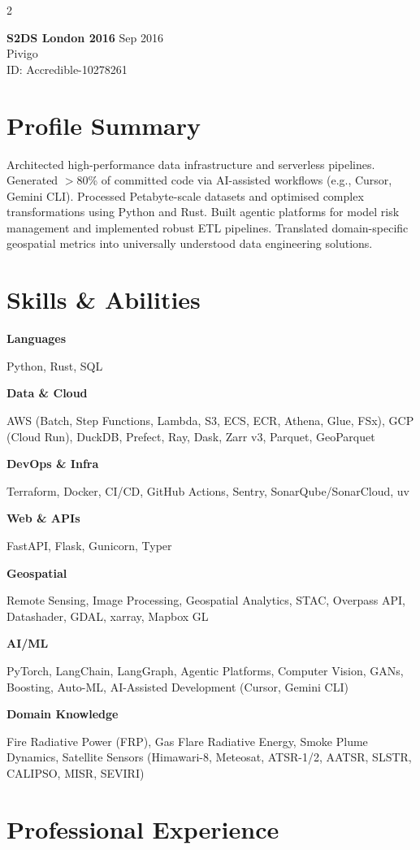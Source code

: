 \documentclass[10pt,a4paper]{article}
\newcommand{\cvitem}[2]{\textbf{#1} \hspace*{\fill} {\small\color{textlight}#2}\\}
\newcommand{\cvsubitem}[1]{{\small\color{textlight}#1}\\}
\newcommand{\skillgroup}[2]{\textbf{#1}\par\vspace{0.2em}#2\par\vspace{0.8em}}
\begin{document}
\begin{paracol}{2}
\begin{leftcolumn}
\cvitem{S2DS London 2016}{Sep 2016}
\cvsubitem{Pivigo}
\cvsubitem{ID: Accredible-10278261}

\end{leftcolumn}

\begin{rightcolumn}
\raggedright

\section*{Profile Summary}
Architected high-performance data infrastructure and serverless pipelines. Generated $>$80\% of committed code via AI-assisted workflows (e.g., Cursor, Gemini CLI). Processed Petabyte-scale datasets and optimised complex transformations using Python and Rust. Built agentic platforms for model risk management and implemented robust ETL pipelines. Translated domain-specific geospatial metrics into universally understood data engineering solutions.

\section*{Skills \& Abilities}
\skillgroup{Languages}{Python, Rust, SQL}
\skillgroup{Data \& Cloud}{AWS (Batch, Step Functions, Lambda, S3, ECS, ECR, Athena, Glue, FSx), GCP (Cloud Run), DuckDB, Prefect, Ray, Dask, Zarr v3, Parquet, GeoParquet}
\skillgroup{DevOps \& Infra}{Terraform, Docker, CI/CD, GitHub Actions, Sentry, SonarQube/SonarCloud, uv}
\skillgroup{Web \& APIs}{FastAPI, Flask, Gunicorn, Typer}
\skillgroup{Geospatial}{Remote Sensing, Image Processing, Geospatial Analytics, STAC, Overpass API, Datashader, GDAL, xarray, Mapbox GL}
\skillgroup{AI/ML}{PyTorch, LangChain, LangGraph, Agentic Platforms, Computer Vision, GANs, Boosting, Auto-ML, AI-Assisted Development (Cursor, Gemini CLI)}
\skillgroup{Domain Knowledge}{Fire Radiative Power (FRP), Gas Flare Radiative Energy, Smoke Plume Dynamics, Satellite Sensors (Himawari-8, Meteosat, ATSR-1/2, AATSR, SLSTR, CALIPSO, MISR, SEVIRI)}

\end{rightcolumn}
\end{paracol}

\vspace{1em}

\section*{Professional Experience}
\end{document}
